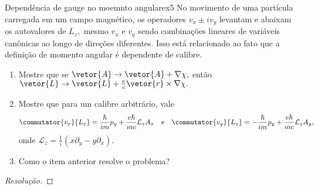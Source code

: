 \begin{exercício}{Dependência de gauge no moemnto angular}{ex5}
   No movimento de uma partícula carregada em um campo magnético, os operadores \(v_x \pm i v_y\) levantam e abaixam os autovalores de \(L_z,\) mesmo \(v_x\) e \(v_y\) sendo combinações lineares de variáveis canônicas ao longo de direções diferentes. Isso está relacionado ao fato que a definição de momento angular é dependente de calibre.
   \begin{enumerate}[label=(\alph*)]
      \item Mostre que se \(\vetor{A} \to \vetor{A} + \nabla\chi,\) então \(\vetor{L} \to \vetor{L} + \frac{e}{c} \vetor{r} \times \nabla\chi.\)
      \item Mostre que para um calibre arbitrário, vale
         \begin{equation*}
            \commutator{v_x}{L_z} = \frac{\hbar}{im} p_y + \frac{e \hbar}{mc} \mathcal{L}_z A_x
            \quad\text{e}\quad
            \commutator{v_y}{L_z} = -\frac{\hbar}{im} p_y + \frac{e \hbar}{mc} \mathcal{L}_z A_y,
         \end{equation*}
         onde \(\mathcal{L}_z = \frac1i \left(x \partial_y - y \partial_x\right).\)
      \item Como o item anterior resolve o problema?
   \end{enumerate}
\end{exercício}
\begin{proof}[Resolução]
    
\end{proof}
